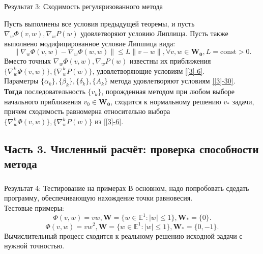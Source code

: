\documentclass[unicode, t, 11pt]{beamer}%
\begin{document}
\begin{frame}
\frametitle{\insertsection}
\framesubtitle{\insertsubsection}
\begin{block}{Результат 3: Сходимость регуляризованного метода}
	\begin{small}
	
	Пусть выполнены все условия предыдущей теоремы, и пусть $\nabla_w\Phi(v,w),\nabla_wP(w)$ удовлетворяют условию Липлища. Пусть также выполнено модифицированное условие Липшица вида:
	\begin{equation}
	\label{[3]-29-2}
	\|\nabla_w\Phi(v,w)-\nabla_w\Phi(w,w)\|\leqslant L\|v-w\|, \forall v,w\in\mathbf{W_0},L=\mathrm{const}>0.
	\end{equation}
	Вместо точных $\nabla_w\Phi(v,w),\nabla_wP(w)$ известны их приближения $\{\nabla_w^k\Phi(v,w)\},\{\nabla_w^kP(w) \}$, удовлетворяющие условиям \eqref{[3]-6}.\\
	Параметры $\{\alpha_k\},\{\beta_k\},\{\delta_k\},\{A_k\}$ метода удовлетворяют условиям \eqref{[3]-30}.\\
	\textbf{Тогда} последовательность $\{v_k\}$, порожденная методом при любом выборе начального приближения $v_0\in \mathbf{W_0}$, сходится к нормальному решению $v_*$ задачи,	причем сходимость равномерна относительно выбора $\{\nabla_w^k\Phi(v,w)\},\{\nabla_w^kP(w) \}$ из \eqref{[3]-6}.
	\end{small}
\end{block}
\end{frame}
\subsection{Часть 3. Численный расчёт: проверка способности метода}
\begin{frame}
\frametitle{\insertsection}
\framesubtitle{\insertsubsection}
\begin{block}{Результат 4: Тестирование на примерах}
	В основном, надо попробовать сдедать программу, обеспечивающую нахождение точки равновесия.\\[5mm]
	
	Тестовые примеры:
	\begin{equation*}
	\Phi(v,w)=vw,\mathbf{W}=\{w\in \mathbb{E}^1:|w|\leqslant 1 \},\mathbf{W_*}=\{0 \}.
	\end{equation*}
	\begin{equation*}
	\Phi(v,w)=vw^2,\mathbf{W}=\{w\in \mathbb{E}^1:|w|\leqslant 1 \},\mathbf{W_*}=\{0,-1 \}.
	\end{equation*}
	Вычислительный процесс сходится к реальному решению исходной задачи с нужной точностью.
\end{block}

\end{frame}
\end{document}
